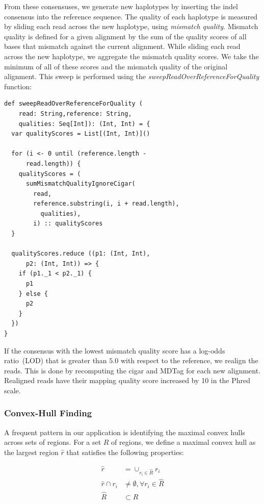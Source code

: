 \documentclass[masters]{ucbthesis}
\begin{document}
From these consensuses, we generate new haplotypes by inserting the indel consensus into the reference sequence. The quality of each haplotype is measured
by sliding each read across the new haplotype, using \emph{mismatch quality}. Mismatch quality is defined for a given alignment by the sum of the quality scores
of all bases that mismatch against the current alignment. While sliding each read across the new haplotype, we aggregate the mismatch quality scores. We take
the minimum of all of these scores and the mismatch quality of the original alignment. This sweep is performed using the \emph{sweepReadOverReferenceForQuality}
function:

\begin{lstlisting}
def sweepReadOverReferenceForQuality (
    read: String,reference: String,
    qualities: Seq[Int]): (Int, Int) = {
  var qualityScores = List[(Int, Int)]()

  for (i <- 0 until (reference.length -
      read.length)) {
    qualityScores = (
      sumMismatchQualityIgnoreCigar(
        read,
        reference.substring(i, i + read.length),
          qualities),
        i) :: qualityScores
  }

  qualityScores.reduce ((p1: (Int, Int),
      p2: (Int, Int)) => {
    if (p1._1 < p2._1) {
      p1
    } else {
      p2
    }
  })
}
\end{lstlisting}

If the consensus with the lowest mismatch quality score has a log-odds ratio~(LOD) that is greater than $5.0$ with respect to the reference, we realign the reads.
This is done by recomputing the cigar and MDTag for each new alignment. Realigned reads have their mapping quality score increased by 10 in the Phred scale.

\subsubsection{Convex-Hull Finding}
\label{sec:convex-hull}

A frequent pattern in our application is identifying the maximal convex hulls across sets of regions. For
a set $R$ of regions, we define a maximal convex hull as the largest region $\hat{r}$ that satisfies the
following properties:

\begin{align}
\label{eqn:convexity-constraint}
\hat{r} &= \cup_{r_i \in \hat{R}} r_i \\
\hat{r} \cap r_i &\ne \emptyset, \forall r_i \in \hat{R} \\
\hat{R} &\subset R
\end{align}
\end{document}

